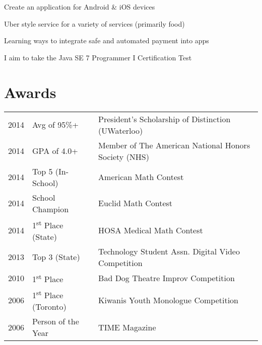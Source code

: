 \documentclass[letterpaper]{deedy-resume} %
\begin{document}
\begin{minipage}[t]{0.66\textwidth}
  \vspace{\topsep} %

  \begin{tightitemize}
  \item Create an application for Android \& iOS devices
  \item Uber style service for a variety of services (primarily food)
  \item Learning ways to integrate safe and automated payment into apps
  \end{tightitemize}

  \sectionspace %



  \vspace{\topsep} %

  \begin{tightitemize}
  \item I aim to take the Java SE 7 Programmer I Certification Test
  \end{tightitemize}

  \sectionspace %


  \section{Awards} 

  \begin{tabular}{rll}

    2014	 & Avg of 95\%+ & President’s Scholarship of Distinction (UWaterloo)\\
    2014	 & GPA of 4.0+ & Member of The American National Honors Society (NHS) \\
    2014	 & Top 5 (In-School) & American Math Contest\\
    2014	 & School Champion & Euclid Math Contest\\
    2014	 & 1\textsuperscript{st} Place (State) & HOSA Medical Math Contest\\
    2013 	 & Top 3 (State) & Technology Student Assn. Digital Video Competition \\
    2010	 & 1\textsuperscript{st} Place & Bad Dog Theatre Improv Competition \\
    2006	 & 1\textsuperscript{st} Place (Toronto) & Kiwanis Youth Monologue Competition \\
    2006	 & Person of the Year & TIME Magazine \\
  \end{tabular}

  \sectionspace %

\end{minipage} %

\end{document}
